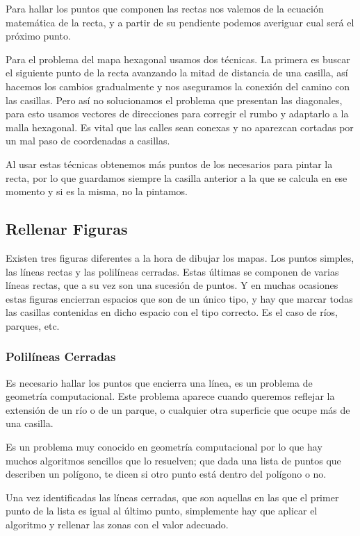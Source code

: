 Para hallar los puntos que componen las rectas nos valemos de la ecuación
matemática de la recta, y a partir de su pendiente podemos averiguar cual será
el próximo punto.

Para el problema del mapa hexagonal usamos dos técnicas. La primera es buscar el
siguiente punto de la recta avanzando la mitad de distancia de una casilla, así
hacemos los cambios gradualmente y nos aseguramos la conexión del camino con
las casillas. Pero así no solucionamos el problema que presentan las diagonales,
para esto usamos vectores de direcciones para corregir el rumbo y adaptarlo a la
malla hexagonal. Es vital que las calles sean conexas y no aparezcan cortadas
por un mal paso de coordenadas a casillas.

Al usar estas técnicas obtenemos más puntos de los necesarios para pintar la
recta, por lo que guardamos siempre la casilla anterior a la que se calcula en
ese momento y si es la misma, no la pintamos.

\subsection*{Rellenar Figuras}

Existen tres figuras diferentes a la hora de dibujar los mapas. Los puntos
simples, las líneas rectas y las polilíneas cerradas. Estas últimas se componen
de varias líneas rectas, que a su vez son una sucesión de puntos. Y en muchas
ocasiones estas figuras encierran espacios que son de un único tipo, y hay que
marcar todas las casillas contenidas en dicho espacio con el tipo correcto. Es
el caso de ríos, parques, etc.

\subsubsection*{Polilíneas Cerradas}

Es necesario hallar los puntos que encierra una línea, es un problema de
geometría computacional. Este problema aparece cuando queremos reflejar la
extensión de un río o de un parque, o cualquier otra superficie que ocupe más de
una casilla.

Es un problema muy conocido en geometría computacional por lo que hay muchos
algoritmos sencillos que lo resuelven; que dada una lista de puntos que
describen un polígono, te dicen si otro punto está dentro del polígono o no.

Una vez identificadas las líneas cerradas, que son aquellas en las que el primer
punto de la lista es igual al último punto, simplemente hay que aplicar el
algoritmo y rellenar las zonas con el valor adecuado.

